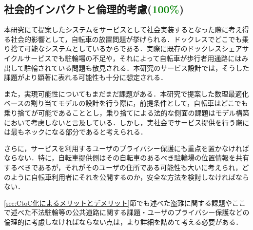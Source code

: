   \subsection{社会的インパクトと倫理的考慮(\textcolor{green}{100\%})}
    \label{sec:社会的インパクトと倫理的考慮}
      \par 本研究にて提案したシステムをサービスとして社会実装するとなった際に考え得る社会的影響として，自転車の放置問題が挙げられる．ドックレスでどこでも乗り捨て可能なシステムとしているからである．実際に既存のドックレスシェアサイクルサービスでも駐輪場の不足や，それによって自転車が歩行者用通路にはみ出して駐輪されている問題も散見される．本研究のサービス設計では，そうした課題がより顕著に表れる可能性も十分に想定される．
      \par また，実現可能性についてもまだまだ課題がある．本研究で提案した数理最適化ベースの割り当てモデルの設計を行う際に，前提条件として，自転車はどこでも乗り捨てが可能であることとし，乗り捨てによる法的な側面の課題はモデル構築において考慮しないと言及している．しかし，実社会でサービス提供を行う際には最もネックになる部分であると考えられる．
      \par さらに，サービスを利用するユーザのプライバシー保護にも重点を置かなければならない．特に，自転車提供側はその自転車のあるべき駐輪場の位置情報を共有するべきであるが，それがそのユーザの住所である可能性も大いに考えられ，どのように自転車利用者にそれを公開するのか，安全な方法を検討しなければならない．
      \par \ref{sec:CtoC化によるメリットとデメリット}節でも述べた盗難に関する課題やここで述べた不法駐輪等の公共道路に関する課題・ユーザのプライバシー保護などの倫理的に考慮しなければならない点は，より詳細を詰めて考える必要がある．
